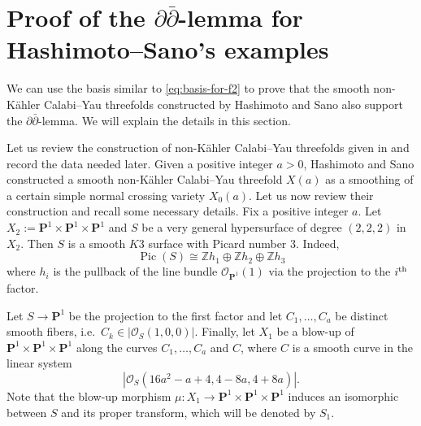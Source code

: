 \section{Proof of the \texorpdfstring{\(\partial\bar{\partial}\)}{ddbar}-lemma
for Hashimoto--Sano's examples}

We can use the basis similar to \eqref{eq:basis-for-f2}
to prove that the
smooth non-K\"{a}hler Calabi--Yau threefolds constructed by Hashimoto and Sano also
support the \(\partial\bar{\partial}\)-lemma. 
We will explain the details in this section.

Let us review the construction of non-K\"{a}hler 
Calabi--Yau threefolds given in \cite{2023-Hashimoto-Sano-examples-of-non-kahler-calabi-yau-3-folds-with-arbitrarily-large-b2}
and record the data needed later.
Given a positive integer \(a>0\), 
Hashimoto and Sano constructed 
a smooth non-K\"{a}hler Calabi--Yau threefold \(X(a)\)
as a smoothing of a certain simple
normal crossing variety \(X_{0}(a)\). Let
us now review their construction and recall some necessary details. Fix
a positive integer \(a\).
Let \(X_{2}:=\mathbf{P}^{1}\times\mathbf{P}^{1}\times\mathbf{P}^{1}\) and
\(S\) be a very general hypersurface of degree \((2,2,2)\) in \(X_{2}\).
Then \(S\) is a smooth \(K3\) surface
with Picard number \(3\). Indeed,
\begin{equation}
\operatorname{Pic}(S)\cong \mathbb{Z}h_{1}\oplus\mathbb{Z}h_{2}\oplus\mathbb{Z}h_{3}
\end{equation}
where \(h_{i}\) is the pullback of the line bundle 
\(\mathcal{O}_{\mathbf{P}^{1}}(1)\) via
the projection to the \(i\textsuperscript{th}\) factor.

Let \(S\to\mathbf{P}^{1}\) be the projection to the first factor
and let \(C_{1},\ldots,C_{a}\) be distinct smooth fibers, 
i.e.~\(C_{k}\in |\mathcal{O}_{S}(1,0,0)|\). Finally, let
\(X_{1}\) be a blow-up of \(\mathbf{P}^{1}\times\mathbf{P}^{1}\times\mathbf{P}^{1}\)
along the curves \(C_{1},\ldots,C_{a}\) and \(C\), where 
\(C\) is a smooth curve in the linear system
\begin{equation}
|\mathcal{O}_{S}(16a^{2}-a+4,4-8a,4+8a)|.
\end{equation}
Note that the blow-up morphism 
\(\mu\colon X_{1}\to \mathbf{P}^1\times\mathbf{P}^{1}\times\mathbf{P}^{1}\)
induces an isomorphic between \(S\) and its proper transform,
which will be denoted by \(S_{1}\).

